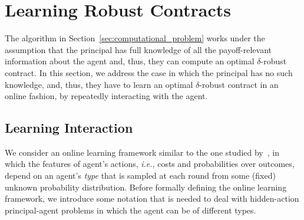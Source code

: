 
\section{Learning Robust Contracts}\label{sec:learning_problem}


The algorithm in Section~\ref{sec:computational_problem} works under the assumption that the principal has full knowledge of all the payoff-relevant information about the agent and, thus, they can compute an optimal $\delta$-robust contract.
%
%
In this section, we address the case in which the principal has no such knowledge, and, thus, they have to learn an optimal $\delta$-robust contract in an online fashion, by repeatedly interacting with the agent.
%


\subsection{Learning Interaction}\label{sec:learning_interaction}


We consider an online learning framework similar to the one studied by~\citet{Zhu2023Sample}, in which the features of agent's actions, \emph{i.e.}, costs and probabilities over outcomes, depend on an agent's \emph{type} that is sampled at each round from some (fixed) unknown probability distribution.
%
Before formally defining the online learning framework, we introduce some notation that is needed to deal with hidden-action principal-agent problems in which the agent can be of different types.


%


